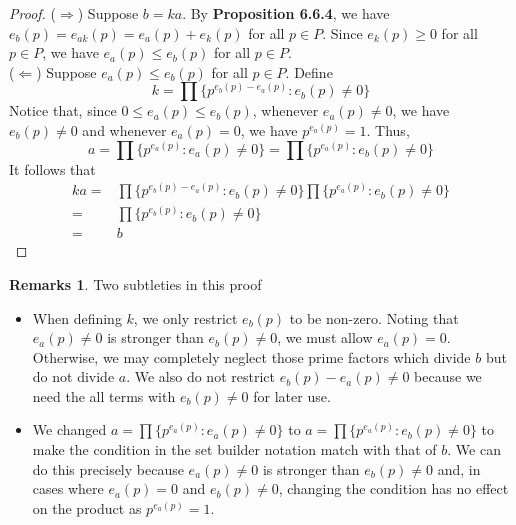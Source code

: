 \documentclass[14pt]{article}
\theoremstyle{definition}
\newtheorem*{remark}{Remarks}
\begin{document}
\begin{proof}
    ($\Rightarrow$) Suppose $b=ka$. By \textbf{Proposition 6.6.4}, we have $e_b(p)=e_{ak}(p)=e_a(p)+e_k(p)$ for all $p\in P$. Since $e_k(p)\geq 0 $ for all $p\in P$, we have $e_a(p)\leq e_b(p)$ for all $p\in P$.\\
    ($\Leftarrow$) Suppose $e_a(p)\leq e_b(p)$  for all $p\in P$. Define
    \begin{equation*}
            k=\prod\{p^{e_b(p)-e_a(p)}\colon e_b(p)\not=0\}
    \end{equation*}
    Notice that,  since $0\leq e_a(p)\leq e_b(p)$, whenever $e_a(p)\not=0$, we have $e_b(p)\not=0$ and whenever $e_a(p)=0$, we have $p^{e_a(p)}=1$. Thus,
    \begin{equation*}
        a=\prod\{p^{e_a(p)}\colon e_a(p)\not=0\}=\prod\{p^{e_a(p)}\colon e_b(p)\not=0\}
    \end{equation*}
    It follows that 
    \begin{equation*}
       \begin{split}
           ka=& \prod\{p^{e_b(p)-e_a(p)}\colon e_b(p)\not=0\}\prod\{p^{e_a(p)}\colon e_b(p)\not=0\}\\
           =&\prod\{p^{e_b(p)}\colon e_b(p)\not=0\}\\
           =&b
       \end{split}
    \end{equation*}
\end{proof}

\begin{remark}
    Two subtleties in this proof
    \begin{itemize}
        \item When defining $k$, we only restrict $e_b(p)$ to be non-zero. Noting that $e_a(p)\not=0$ is stronger than $e_b(p)\not=0$, we must allow $e_a(p)=0$. Otherwise, we may completely neglect those prime factors which divide $b$ but do not divide $a$. We also do not restrict $e_b(p)-e_a(p)\not=0$ because we need the all terms with $e_b(p)\not=0$ for later use.
        \item We changed $a=\prod\{p^{e_a(p)}\colon e_a(p)\not=0\}$ to $a=\prod\{p^{e_a(p)}\colon e_b(p)\not=0\}$ to make the condition in the set builder notation match with that of $b$. We can do this precisely because $e_a(p)\not=0$ is stronger than $e_b(p)\not=0$ and, in cases where $e_a(p)=0$ and $e_b(p)\not=0$, changing the condition has no effect on the product as $p^{e_a(p)}=1$.
    \end{itemize}
\end{remark}
\end{document}

